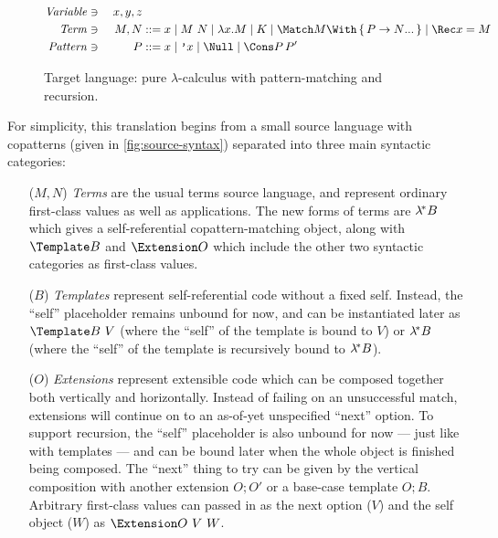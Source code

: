 \begin{figure}
\centering
\begin{alignat*}{2}
  \mathit{Variable} &\ni{}& x, y, z
  \\
  \mathit{Term} &\ni{}& M, N
  &::= x
  \mid M ~ N
  \mid \lambda x. M
  \mid K
  \mid \Match M \With \set{\many{P \to N}}
  \mid \Rec x = M
  \\
  \mathit{Pattern} &\ni{}& P
  &::= x
  \mid \q{x}
  \mid \Null
  \mid \Cons P \, P'
\end{alignat*}

\caption{Target language: pure $\lambda$-calculus with pattern-matching and recursion.}
\label{fig:target-syntax}
\end{figure}

For simplicity, this translation begins from a small source language with copatterns (given in \cref{fig:source-syntax}) separated into three main syntactic categories:
\begin{itemize}
\item[($M, N$)] \emph{Terms} are the usual terms source language, and represent ordinary first-class values as well as applications.
  The new forms of terms are $\lambda^{\!*} B$ which gives a self-referential copattern-matching object, along with $\Template B$ and $\Extension O$ which include the other two syntactic categories as first-class values.
\item[($B$)] \emph{Templates} represent self-referential code without a fixed self.
  Instead, the ``self'' placeholder remains unbound for now, and can be instantiated later as $\Template B ~ V$ (where the ``self'' of the template is bound to $V$) or $\lambda^{\!*} B$ (where the ``self'' of the template is recursively bound to $\lambda^{\!*} B$).
\item[($O$)] \emph{Extensions} represent extensible code which can be composed together both vertically and horizontally.
  Instead of failing on an unsuccessful match, extensions will continue on to an as-of-yet unspecified ``next'' option.
  To support recursion, the ``self'' placeholder is also unbound for now --- just like with templates --- and can be bound later when the whole object is finished being composed.
  The ``next'' thing to try can be given by the vertical composition with another extension $O; O'$ or a base-case template $O; B$.
  Arbitrary first-class values can passed in as the next option ($V$) and the self object ($W$) as $\Extension O ~ V ~ W$.
\end{itemize}

